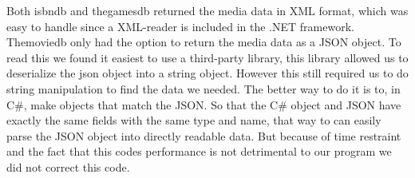 Both isbndb and thegamesdb returned the media data in XML format, which was easy to handle since a XML-reader is included in the .NET framework. Themoviedb only had the option to return the media data as a JSON object. To read this we found it easiest to use a third-party library\cite{jamesJson}, this library allowed us to deserialize the json object into a string object. However this still required us to do string manipulation to find the data we needed. The better way to do it is to, in C\#, make objects that match the JSON. So that the C\# object and JSON have exactly the same fields with the same type and name, that way to can easily parse the JSON object into directly readable data. But because of time restraint and the fact that this codes performance is not detrimental to our program we did not correct this code.



